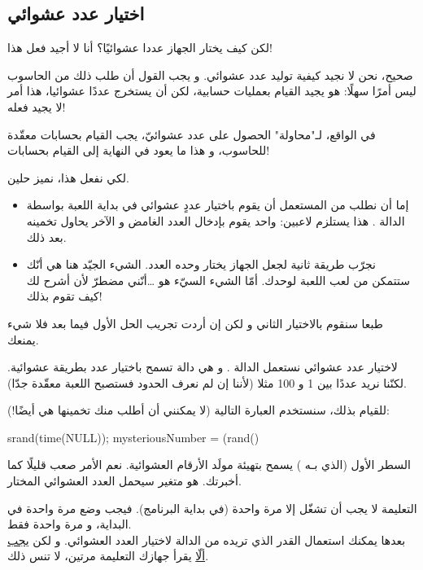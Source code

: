 \subsection{اختيار عدد عشوائي}

\begin{question}
لكن كيف يختار الجهاز عددا عشوائيًا؟ أنا لا أجيد فعل هذا!
\end{question}

صحيح، نحن لا نجيد كيفية توليد عدد عشوائي. و يجب القول أن طلب ذلك من الحاسوب ليس أمرًا سهلًا: هو يجيد القيام بعمليات حسابية، لكن أن يستخرج عددًا عشوائيا، هذا أمر لا يجيد فعله!

في الواقع، لـ"محاولة" الحصول على عدد عشوائيّ، يجب القيام بحسابات معقّدة للحاسوب، و هذا ما يعود في النهاية إلى القيام بحسابات!

لكي نفعل هذا، نميز حلين.
\begin{itemize}
	\item إما أن نطلب من المستعمل أن يقوم باختيار عددٍ عشوائي في بداية اللعبة بواسطة الدالة 
	.
	هذا يستلزم لاعبين: واحد يقوم بإدخال العدد الغامض و الآخر يحاول تخمينه بعد ذلك.
	\item نجرّب طريقة ثانية لجعل الجهاز يختار وحده العدد. الشيء الجيّد هنا هي أنّك ستتمكن من لعب اللعبة لوحدك. أمّا الشيء السيّء هو \dots أنّني مضطرّ لأن أشرح لك كيف تقوم بذلك!
\end{itemize}

طبعا سنقوم بالاختيار الثاني و لكن إن أردت تجريب الحل الأول فيما بعد فلا شيء يمنعك.

لاختيار عدد عشوائي نستعمل الدالة 
.
و هي دالة تسمح باختيار عدد بطريقة عشوائية. لكنّنا نريد عددًا بين 1 و 100 مثلا (لأننا إن لم نعرف الحدود فستصبح اللعبة معقّدة جدّا).

للقيام بذلك، سنستخدم العبارة التالية (لا يمكنني أن أطلب منك تخمينها هي أيضًا!):

\begin{Csource}
srand(time(NULL));
mysteriousNumber = (rand() %
\end{Csource}

السطر الأول (الذي بـه
)
يسمح بتهيئة مولَد الأرقام العشوائية. نعم الأمر صعب قليلًا كما أخبرتك.
هو متغير سيحمل العدد العشوائي المختار.

\begin{warning}
التعليمة 
لا يجب أن تشغّل إلا مرة واحدة (في بداية البرنامج). فيجب وضع 
مرة واحدة في البداية، و مرة واحدة فقط. \\
بعدها يمكنك استعمال القدر الذي تريده من الدالة 
لاختيار العدد العشوائي. و لكن 
\underline{يجب ألّا}
 يقرأ جهازك التعليمة
مرتين، لا تنس ذلك.
\end{warning}

